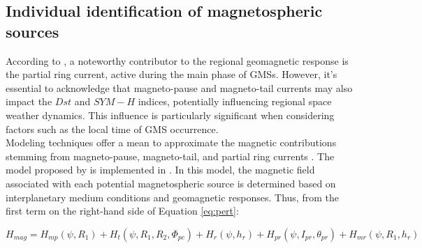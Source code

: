 \documentclass[12pt]{article}
\begin{document}
\subsection{Individual identification of magnetospheric sources}
According to \cite{partialringcurrentidx}, a noteworthy contributor to the regional geomagnetic response is the partial ring current, active during the main phase of GMSs. However, it's essential to acknowledge that magneto-pause and magneto-tail currents may also impact the $Dst$ and $SYM-H$ indices, potentially influencing regional space weather dynamics. This influence is particularly significant when considering factors such as the local time of GMS occurrence.\\

Modeling techniques offer a mean to approximate the magnetic contributions stemming from magneto-pause, magneto-tail, and partial ring currents \citep{partialringcurrentasym}. The model proposed by \cite{parabmagnet} is implemented in \cite{magnetosphericcurrentscontr, partialringcurrentasym}. In this model, the magnetic field associated with each potential magnetospheric source is determined based on interplanetary medium conditions and geomagnetic responses. Thus, from the first term on the right-hand side of Equation \ref{eq:pert}:

\begin{equation}
	H_{mag} = H_{mp}(\psi, R_1)+H_t(\psi, R_1, R_2, \Phi_{pc})+H_r(\psi, h_r) + H_{pr}(\psi, I_{pr}, \theta_{pr}) + H_{mr}(\psi, R_1, h_r)
\end{equation}	
\end{document}
